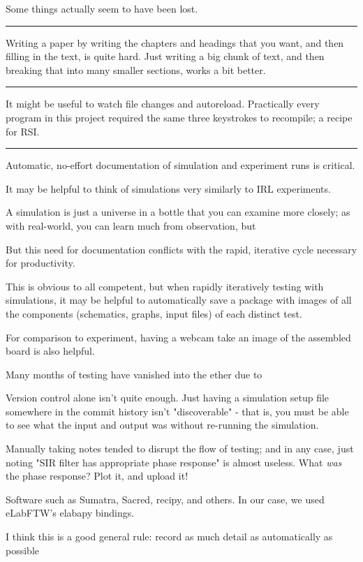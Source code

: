 \documentclass[paper.tex]{subfiles}
\begin{document}
Some things actually seem to have been lost.

\rule{\linewidth}{0.2pt}

Writing a paper by writing the chapters and headings that you want, and then filling in the text, is quite hard. Just writing a big chunk of text, and then breaking that into many smaller sections, works a bit better.


\rule{\linewidth}{0.2pt}

It might be useful to watch file changes and autoreload. Practically every program in this project required the same three keystrokes to recompile; a recipe for RSI.

\rule{\linewidth}{0.2pt}

Automatic, no-effort documentation of simulation and experiment runs is critical.

It may be helpful to think of simulations very similarly to IRL experiments. 

A simulation is just a universe in a bottle that you can examine more closely; as with real-world, you can learn much from observation, but 

But this need for documentation conflicts with the rapid, iterative cycle necessary for productivity.

This is obvious to all competent, but when rapidly iteratively testing with simulations, it may be helpful to automatically save a package with images of all the components (schematics, graphs, input files) of each distinct test. 

For comparison to experiment, having a webcam take an image of the assembled board is also helpful. 

Many months of testing have vanished into the ether due to 

Version control alone isn't quite enough. Just having a simulation setup file somewhere in the commit history isn't "discoverable" - that is, you must be able to see what the input and output was without re-running the simulation. 

Manually taking notes tended to disrupt the flow of testing; and in any case, just noting "SIR filter has appropriate phase response" is almost useless. What {\it was} the phase response? Plot it, and upload it!

Software such as Sumatra, Sacred, recipy, and others. In our case, we used eLabFTW's elabapy bindings.

I think this is a good general rule: record as much detail as automatically as possible
\end{document}
